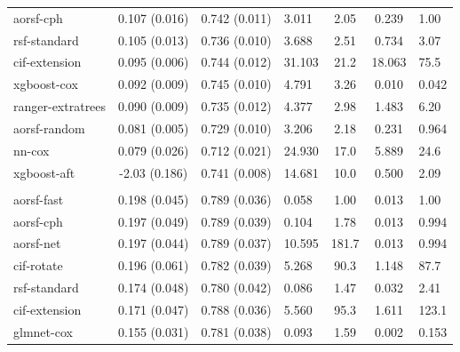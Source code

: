 \documentclass[twoside,11pt]{article}\usepackage[]{graphicx}\usepackage[]{xcolor}
\newenvironment{knitrout}{}{} %
\begin{document}
\begin{knitrout}
\begin{longtable}{lcclccl}
\hspace{1em}aorsf-cph & 0.107 (0.016) & 0.742 (0.011) & 3.011 & 2.05 & 0.239 & 1.00\\
\hspace{1em}rsf-standard & 0.105 (0.013) & 0.736 (0.010) & 3.688 & 2.51 & 0.734 & 3.07\\
\hspace{1em}cif-extension & 0.095 (0.006) & 0.744 (0.012) & 31.103 & 21.2 & 18.063 & 75.5\\
\hspace{1em}xgboost-cox & 0.092 (0.009) & 0.745 (0.010) & 4.791 & 3.26 & 0.010 & 0.042\\
\hspace{1em}ranger-extratrees & 0.090 (0.009) & 0.735 (0.012) & 4.377 & 2.98 & 1.483 & 6.20\\
\hspace{1em}aorsf-random & 0.081 (0.005) & 0.729 (0.010) & 3.206 & 2.18 & 0.231 & 0.964\\
\hspace{1em}nn-cox & 0.079 (0.026) & 0.712 (0.021) & 24.930 & 17.0 & 5.889 & 24.6\\
\hspace{1em}xgboost-aft & -2.03 (0.186) & 0.741 (0.008) & 14.681 & 10.0 & 0.500 & 2.09\\
\addlinespace[0.3em]
\hline
\multicolumn{7}{l}{\textit{\textbf{VA lung cancer trial; death, n = 137, p = 8}}}\\
\hline
\hspace{1em}aorsf-fast & 0.198 (0.045) & 0.789 (0.036) & 0.058 & 1.00 & 0.013 & 1.00\\
\hspace{1em}aorsf-cph & 0.197 (0.049) & 0.789 (0.039) & 0.104 & 1.78 & 0.013 & 0.994\\
\hspace{1em}aorsf-net & 0.197 (0.044) & 0.789 (0.037) & 10.595 & 181.7 & 0.013 & 0.994\\
\hspace{1em}cif-rotate & 0.196 (0.061) & 0.782 (0.039) & 5.268 & 90.3 & 1.148 & 87.7\\
\hspace{1em}rsf-standard & 0.174 (0.048) & 0.780 (0.042) & 0.086 & 1.47 & 0.032 & 2.41\\
\hspace{1em}cif-extension & 0.171 (0.047) & 0.788 (0.036) & 5.560 & 95.3 & 1.611 & 123.1\\
\hspace{1em}glmnet-cox & 0.155 (0.031) & 0.781 (0.038) & 0.093 & 1.59 & 0.002 & 0.153\\

\end{longtable}
\end{knitrout}
\end{document}
